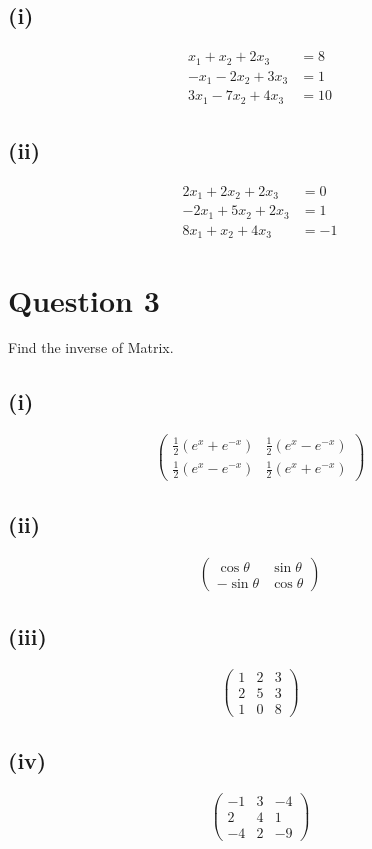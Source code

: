 \documentclass[12pt]{article}
\begin{document}
\subsection*{(i)}
\begin{align*}
x_1 + x_2 + 2x_3 &= 8\\
-x_1 - 2x_2 + 3x_3 &= 1\\
3x_1 - 7x_2 + 4x_3 &= 10
\end{align*}

\subsection*{(ii)}
\begin{align*}
2x_1 + 2x_2 + 2x_3 &= 0\\
-2x_1 + 5x_2 + 2x_3 &= 1\\
8x_1 + x_2 + 4x_3 &= -1
\end{align*}

\section*{Question 3}
Find the inverse of Matrix.

\subsection*{(i)}
\[
\begin{pmatrix}
\frac{1}{2}(e^x + e^{-x}) & \frac{1}{2}(e^x - e^{-x})\\
\frac{1}{2}(e^x - e^{-x}) & \frac{1}{2}(e^x + e^{-x})
\end{pmatrix}
\]

\subsection*{(ii)}
\[
\begin{pmatrix}
\cos\theta & \sin\theta\\
-\sin\theta & \cos\theta
\end{pmatrix}
\]

\subsection*{(iii)}
\[
\begin{pmatrix}
1 & 2 & 3\\
2 & 5 & 3\\
1 & 0 & 8
\end{pmatrix}
\]

\subsection*{(iv)}
\[
\begin{pmatrix}
-1 & 3 & -4\\
2 & 4 & 1\\
-4 & 2 & -9
\end{pmatrix}
\]
\end{document}
